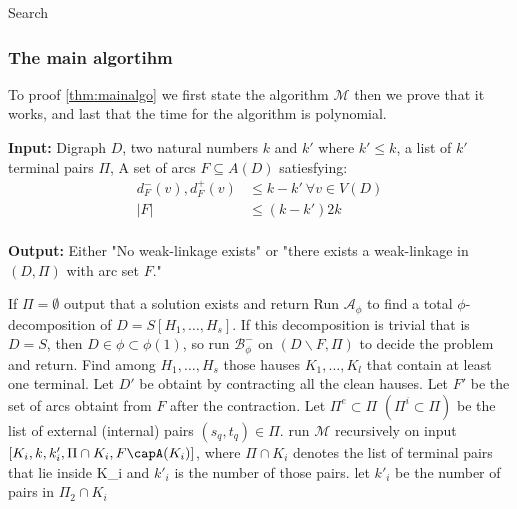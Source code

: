 \documentclass{beamer}
\renewcommand{\algorithmicrequire}{\textbf{Input:}}
\renewcommand{\algorithmicensure}{\textbf{Output:}}
\newcommand{\alginput}[1]{\hspace*{\algorithmicindent}\algorithmicrequire{#1}}
\newcommand{\algoutput}[1]{\hspace*{\algorithmicindent}\algorithmicensure{#1}}
\newcommand{\algio}[2]{
	\alginput{#1}\\
	\algoutput{#2}
}
\begin{document}
\begin{frame}[allowframebreaks]{Search}
    \frametitle{The main algortihm}
    To proof \autoref{thm:mainalgo} we first state the algorithm $\mathcal{M}$ then we prove that it works, and last that the time for the algorithm is polynomial.

        \begin{algorithmic}[1]
            \algio{
                Digraph $D$, two natural numbers $k$ and $k'$ where $k'\leq k$, a list of $k'$ terminal pairs $\Pi$, A set of arcs $F\subseteq A(D)$ satiesfying:
                \begin{align*}
                    d^-_F(v),d^+_F(v)&\leq k-k' \ \forall v\in V(D)\\
                    |F|&\leq (k-k')2k
                \end{align*}
            }{
                Either "No weak-linkage exists" or "there exists a weak-linkage in $(D,\Pi)$ with arc set $F$."
            }
            \STATE If $\Pi=\emptyset$ output that a solution exists and return
            \STATE Run $\mathcal{A}_\phi$ to find a total $\phi$-decomposition of $D=S[H_1,\dots,H_s]$.
            \STATE If this decomposition is trivial that is $D=S$, then  $D\in \phi\subset \phi(1)$, so run $\mathcal{B}^-_{\phi}$ on $(D\backslash F,\Pi)$ to decide the problem and return.
            \STATE Find among $H_1,\dots, H_s$ those hauses $K_1,\dots , K_l$ that contain at least one terminal. Let $D'$ be obtaint by contracting all the clean hauses. Let $F'$ be the set of arcs obtaint from $F$ after the contraction.
            \STATE Let $\Pi^e\subset \Pi$ $(\Pi^i\subset \Pi)$ be the list of external (internal) pairs $(s_q,t_q)\in \Pi$.
                    \STATE run $\mathcal{M}$ recursively on input $[K_i,k,k'_i,\Pi \cap K_i,F\capA(K_i)]$, where $\Pi\cap K_i$ denotes the list of terminal pairs that lie inside K_i and $k'_i$ is the number of those pairs.
                \ENDIF
                    \STATE let $k'_i$ be the number of pairs in $\Pi_2\cap K_i$
\end{algorithmic}
\end{frame}
\end{document}
